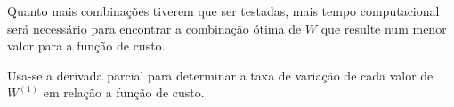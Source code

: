 
Quanto mais combinações tiverem que ser testadas, mais tempo computacional será necessário para encontrar a combinação ótima de $W$ que resulte num menor valor para a função de custo.

Usa-se a derivada parcial para determinar a taxa de variação de cada valor de $W^{(1)}$ em relação a função de custo. 





